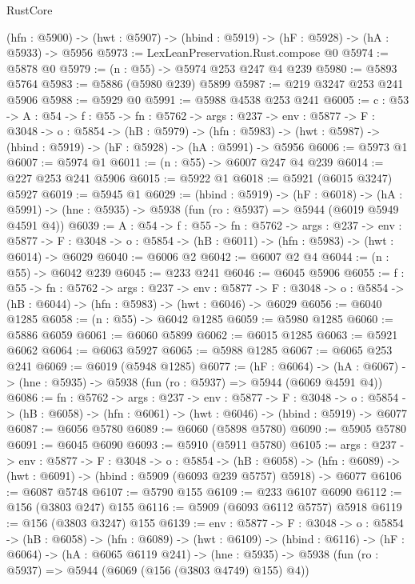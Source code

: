 \begin{lexlean}{RustCore}
\begin{coremodule}
  (hfn : @5900) -> (hwt : @5907) -> (hbind : @5919) -> (hF : @5928) -> (hA : @5933) -> @5956
@5973 := LexLeanPreservation.Rust.compose @0
@5974 := @5878 @0
@5979 := (n : @55) -> @5974 @253 @247 @4 @239
@5980 := @5893 @5764
@5983 := @5886 (@5980 @239) @5899
@5987 := @219 @3247 @253 @241 @5906
@5988 := @5929 @0
@5991 := @5988 @4538 @253 @241
@6005 := {c : @53} ->
  {A : @54} ->
  {f : @55} ->
  {fn : @5762} ->
  {args : @237} ->
  {env : @5877} ->
  {F : @3048} ->
  {o : @5854} ->
  (hB : @5979) ->
  (hfn : @5983) -> (hwt : @5987) -> (hbind : @5919) -> (hF : @5928) -> (hA : @5991) -> @5956
@6006 := @5973 @1
@6007 := @5974 @1
@6011 := (n : @55) -> @6007 @247 @4 @239
@6014 := @227 @253 @241 @5906
@6015 := @5922 @1
@6018 := @5921 (@6015 @3247) @5927
@6019 := @5945 @1
@6029 := (hbind : @5919) ->
  (hF : @6018) ->
  (hA : @5991) -> (hne : @5935) -> @5938 (fun (ro : @5937) => @5944 (@6019 @5949 @4591 @4))
@6039 := {A : @54} ->
  {f : @55} ->
  {fn : @5762} ->
  {args : @237} ->
  {env : @5877} ->
  {F : @3048} -> {o : @5854} -> (hB : @6011) -> (hfn : @5983) -> (hwt : @6014) -> @6029
@6040 := @6006 @2
@6042 := @6007 @2 @4
@6044 := (n : @55) -> @6042 @239
@6045 := @233 @241
@6046 := @6045 @5906
@6055 := {f : @55} ->
  {fn : @5762} ->
  {args : @237} ->
  {env : @5877} ->
  {F : @3048} -> {o : @5854} -> (hB : @6044) -> (hfn : @5983) -> (hwt : @6046) -> @6029
@6056 := @6040 @1285
@6058 := (n : @55) -> @6042 @1285
@6059 := @5980 @1285
@6060 := @5886 @6059
@6061 := @6060 @5899
@6062 := @6015 @1285
@6063 := @5921 @6062
@6064 := @6063 @5927
@6065 := @5988 @1285
@6067 := @6065 @253 @241
@6069 := @6019 (@5948 @1285)
@6077 := (hF : @6064) ->
  (hA : @6067) -> (hne : @5935) -> @5938 (fun (ro : @5937) => @5944 (@6069 @4591 @4))
@6086 := {fn : @5762} ->
  {args : @237} ->
  {env : @5877} ->
  {F : @3048} ->
  {o : @5854} -> (hB : @6058) -> (hfn : @6061) -> (hwt : @6046) -> (hbind : @5919) -> @6077
@6087 := @6056 @5780
@6089 := @6060 (@5898 @5780)
@6090 := @5905 @5780
@6091 := @6045 @6090
@6093 := @5910 (@5911 @5780)
@6105 := {args : @237} ->
  {env : @5877} ->
  {F : @3048} ->
  {o : @5854} ->
  (hB : @6058) ->
  (hfn : @6089) -> (hwt : @6091) -> (hbind : @5909 (@6093 @239 @5757) @5918) -> @6077
@6106 := @6087 @5748
@6107 := @5790 @155
@6109 := @233 @6107 @6090
@6112 := @156 (@3803 @247) @155
@6116 := @5909 (@6093 @6112 @5757) @5918
@6119 := @156 (@3803 @3247) @155
@6139 := {env : @5877} ->
  {F : @3048} ->
  {o : @5854} ->
  (hB : @6058) ->
  (hfn : @6089) ->
  (hwt : @6109) ->
  (hbind : @6116) ->
  (hF : @6064) ->
  (hA : @6065 @6119 @241) ->
  (hne : @5935) -> @5938 (fun (ro : @5937) => @5944 (@6069 (@156 (@3803 @4749) @155) @4))

\end{coremodule}
\end{lexlean}
